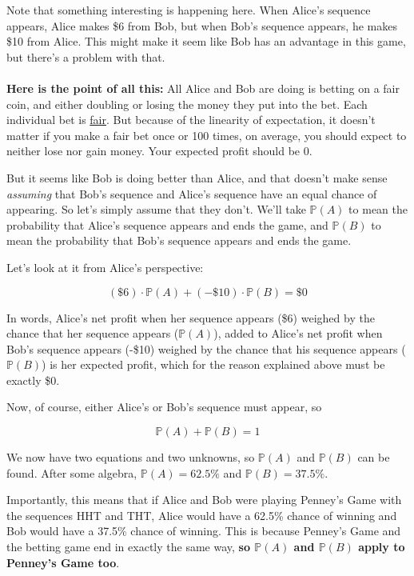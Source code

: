 \documentclass[english,12pt,a4paper,final]{article}
\begin{document}
Note that something interesting is happening here. When Alice's sequence appears, Alice makes \$6 from Bob, but when Bob's sequence appears, he makes \$10 from Alice. This might make it seem like Bob has an advantage in this game, but there's a problem with that.
\\\\
\textbf{Here is the point of all this:} All Alice and Bob are doing is betting on a fair coin, and either doubling or losing the money they put into the bet. Each individual bet is \underline{fair}. But because of the linearity of expectation, it doesn't matter if you make a fair bet once or 100 times, on average, you should expect to neither lose nor gain money. Your expected profit should be 0.

But it seems like Bob is doing better than Alice, and that doesn't make sense \textit{assuming} that Bob's sequence and Alice's sequence have an equal chance of appearing. So let's simply assume that they don't. We'll take $\mathbb{P}(A)$ to mean the probability that Alice's sequence appears and ends the game, and $\mathbb{P}(B)$ to mean the probability that Bob's sequence appears and ends the game.

Let's look at it from Alice's perspective:

\begin{equation*}
	(\$6) \cdot \mathbb{P}(A)  + (-\$10) \cdot \mathbb{P}(B) = \$0
\end{equation*}

In words, Alice's net profit when her sequence appears (\$6) weighed by the chance that her sequence appears ($\mathbb{P}(A)$), added to Alice's net profit when Bob's sequence appears (-\$10) weighed by the chance that his sequence appears ($\mathbb{P}(B)$) is her expected profit, which for the reason explained above must be exactly \$0.

Now, of course, either Alice's or Bob's sequence must appear, so

\begin{equation}\label{PA+PB=1}
	\mathbb{P}(A) + \mathbb{P}(B) = 1
\end{equation}

We now have two equations and two unknowns, so $\mathbb{P}(A)$ and $\mathbb{P}(B)$ can be found. After some algebra, $\mathbb{P}(A) = 62.5\%$ and $\mathbb{P}(B) = 37.5\%$.

Importantly, this means that if Alice and Bob were playing Penney's Game with the sequences HHT and THT, Alice would have a 62.5\% chance of winning and Bob would have a 37.5\% chance of winning. This is because Penney's Game and the betting game end in exactly the same way, \textbf{so $\mathbb{P}(A)$ and $\mathbb{P}(B)$ apply to Penney's Game too}.
\end{document}

